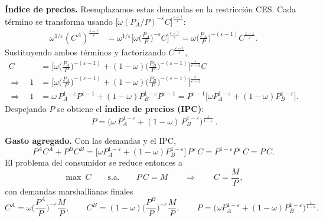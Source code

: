 \documentclass[11pt]{article}
\renewcommand{\boxed}[1]{#1}     %
\theoremstyle{definition}
\begin{document}
\textbf{Índice de precios.} Reemplazamos estas demandas en la restricción CES. Cada término se
transforma usando $\big[\omega(P_{A}/P)^{-\varepsilon}C\big]^{\frac{\varepsilon-1}{\varepsilon}}$:
\begin{align}
\omega^{1/\varepsilon}(C^{A})^{\frac{\varepsilon-1}{\varepsilon}}
&=\omega^{1/\varepsilon}\Big[\omega\Big(\tfrac{P_{A}}{P}\Big)^{-\varepsilon}C\Big]^{\frac{\varepsilon-1}{\varepsilon}}
=\omega\Big(\tfrac{P_{A}}{P}\Big)^{-(\varepsilon-1)}C^{\frac{\varepsilon-1}{\varepsilon}} .
\end{align}
Sustituyendo ambos términos y factorizando $C^{\frac{\varepsilon-1}{\varepsilon}}$,
\begin{align}
C&=\Big[\omega\Big(\tfrac{P_{A}}{P}\Big)^{-(\varepsilon-1)}+(1-\omega)\Big(\tfrac{P_{B}}{P}\Big)^{-(\varepsilon-1)}\Big]^{\frac{\varepsilon}{\varepsilon-1}}C
\\[2pt]
\Longrightarrow\quad 1&=\Big[\omega\Big(\tfrac{P_{A}}{P}\Big)^{-(\varepsilon-1)}+(1-\omega)\Big(\tfrac{P_{B}}{P}\Big)^{-(\varepsilon-1)}\Big]^{\frac{\varepsilon}{\varepsilon-1}}
\\[2pt]
\Longrightarrow\quad 1&=\omega\,P_{A}^{1-\varepsilon}P^{\varepsilon-1}+(1-\omega)P_{B}^{1-\varepsilon}P^{\varepsilon-1}
=P^{\varepsilon-1}\big[\omega P_{A}^{1-\varepsilon}+(1-\omega)P_{B}^{1-\varepsilon}\big].
\end{align}
Despejando $P$ se obtiene el \textbf{índice de precios (IPC)}:
\begin{equation}
\boxed{\ P=\big(\omega\,P_{A}^{1-\varepsilon}+(1-\omega)\,P_{B}^{1-\varepsilon}\big)^{\frac{1}{1-\varepsilon}}\ }.
\end{equation}

\textbf{Gasto agregado.} Con las demandas y el IPC,
\begin{equation}
P^{A}C^{A}+P^{B}C^{B}
=\big[\omega P_{A}^{1-\varepsilon}+(1-\omega)P_{B}^{1-\varepsilon}\big]\,P^{\varepsilon}\,C
=P^{1-\varepsilon}P^{\varepsilon}\,C=P\,C .
\end{equation}
El problema del consumidor se reduce entonces a
\begin{equation}
\max\ C\qquad\text{s.a.}\qquad P\,C=M
\qquad\Longrightarrow\qquad C=\frac{M}{P},
\end{equation}
con demandas marshallianas finales
\begin{equation}
C^{A}=\omega\Big(\frac{P^{A}}{P}\Big)^{-\varepsilon}\frac{M}{P},
\qquad
C^{B}=(1-\omega)\Big(\frac{P^{B}}{P}\Big)^{-\varepsilon}\frac{M}{P},
\qquad
P=\big(\omega P_{A}^{1-\varepsilon}+(1-\omega)P_{B}^{1-\varepsilon}\big)^{\frac{1}{1-\varepsilon}} .
\end{equation}
\end{document}
